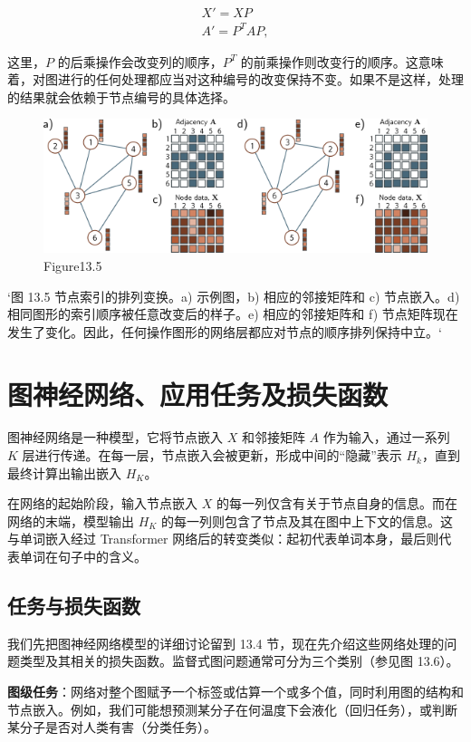 \begin{align}
X' = XP \\
A' = P^TAP, 
\end{align} 


这里，\(P\) 的后乘操作会改变列的顺序，\(P^T\) 的前乘操作则改变行的顺序。这意味着，对图进行的任何处理都应当对这种编号的改变保持不变。如果不是这样，处理的结果就会依赖于节点编号的具体选择。

\begin{figure}[ht!]
\centering
\includegraphics[width=0.7\linewidth]{png/chapter13/GraphNodeEquiv.png}
\caption{Figure13.5}
\end{figure}

`图 13.5 节点索引的排列变换。a) 示例图，b) 相应的邻接矩阵和 c) 节点嵌入。d) 相同图形的索引顺序被任意改变后的样子。e) 相应的邻接矩阵和 f) 节点矩阵现在发生了变化。因此，任何操作图形的网络层都应对节点的顺序排列保持中立。`

\section{图神经网络、应用任务及损失函数}
图神经网络是一种模型，它将节点嵌入 \(X\) 和邻接矩阵 \(A\) 作为输入，通过一系列 \(K\) 层进行传递。在每一层，节点嵌入会被更新，形成中间的“隐藏”表示 \(H_k\)，直到最终计算出输出嵌入 \(H_K\)。

在网络的起始阶段，输入节点嵌入 \(X\) 的每一列仅含有关于节点自身的信息。而在网络的末端，模型输出 \(H_K\) 的每一列则包含了节点及其在图中上下文的信息。这与单词嵌入经过 Transformer 网络后的转变类似：起初代表单词本身，最后则代表单词在句子中的含义。

\subsection{任务与损失函数}
我们先把图神经网络模型的详细讨论留到 13.4 节，现在先介绍这些网络处理的问题类型及其相关的损失函数。监督式图问题通常可分为三个类别（参见图 13.6）。

\textbf{图级任务}：网络对整个图赋予一个标签或估算一个或多个值，同时利用图的结构和节点嵌入。例如，我们可能想预测某分子在何温度下会液化（回归任务），或判断某分子是否对人类有害（分类任务）。

